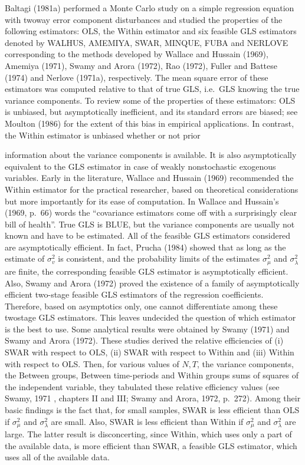 \documentclass[
]{book}
\begin{document}
Baltagi (1981a) performed a Monte Carlo study on a simple regression equation with twoway error component disturbances and studied the properties of the following estimators:
OLS, the Within estimator and six feasible GLS estimators denoted by WALHUS, AMEMIYA, SWAR, MINQUE, FUBA and NERLOVE corresponding to the methods developed by Wallace and Hussain (1969), Amemiya (1971), Swamy and Arora (1972), Rao (1972), Fuller and Battese (1974) and Nerlove (1971a), respectively. The mean square error of these estimators was computed relative to that of true GLS, i.e.~GLS knowing the true variance components. To review some of the properties of these estimators: OLS is unbiased, but asymptotically inefficient, and its standard errors are biased; see Moulton (1986) for the extent of this bias in empirical applications. In contrast, the Within estimator is unbiased whether or not prior

information about the variance components is available. It is also asymptotically equivalent to the GLS estimator in case of weakly nonstochastic exogenous variables. Early in the literature, Wallace and Hussain (1969) recommended the Within estimator for the practical researcher, based on theoretical considerations but more importantly for its ease of computation. In Wallace and Hussain's (1969, p.~66) words the ``covariance estimators come off with a surprisingly clear bill of health''. True GLS is BLUE, but the variance components are usually not known and have to be estimated. All of the feasible GLS estimators considered are asymptotically efficient. In fact, Prucha (1984) showed that as long as the estimate of \(\sigma_{v}^{2}\) is consistent, and the probability limits of the estimates \(\sigma_{\mu}^{2}\) and \(\sigma_{\lambda}^{2}\) are finite, the corresponding feasible GLS estimator is asymptotically efficient. Also, Swamy and Arora (1972) proved the existence of a family of asymptotically efficient two-stage feasible GLS estimators of the regression coefficients. Therefore, based on asymptotics only, one cannot differentiate among these twostage GLS estimators. This leaves undecided the question of which estimator is the best to use. Some analytical results were obtained by Swamy (1971) and Swamy and Arora (1972). These studies derived the relative efficiencies of (i) SWAR with respect to OLS, (ii) SWAR with respect to Within and (iii) Within with respect to OLS. Then, for various values of \(N, T\), the variance components, the Between groups, Between time-periods and Within groups sums of squares of the independent variable, they tabulated these relative efficiency values (see Swamy, 1971 , chapters II and III; Swamy and Arora, 1972, p.~272). Among their basic findings is the fact that, for small samples, SWAR is less efficient than OLS if \(\sigma_{\mu}^{2}\) and \(\sigma_{\lambda}^{2}\) are small. Also, SWAR is less efficient than Within if \(\sigma_{\mu}^{2}\) and \(\sigma_{\lambda}^{2}\) are large. The latter result is disconcerting, since Within, which uses only a part of the available data, is more efficient than SWAR, a feasible GLS estimator, which uses all of the available data.
\end{document}
